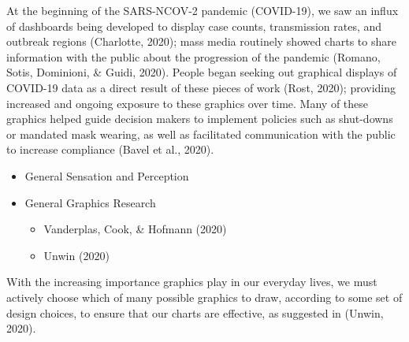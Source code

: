 \documentclass[print]{nuthesis}
\providecommand{\tightlist}{%
  \setlength{\itemsep}{0pt}\setlength{\parskip}{0pt}}
\begin{document}
At the beginning of the SARS-NCOV-2 pandemic (COVID-19), we saw an influx of dashboards being developed to display case counts, transmission rates, and outbreak regions (Charlotte, 2020); mass media routinely showed charts to share information with the public about the progression of the pandemic (Romano, Sotis, Dominioni, \& Guidi, 2020).
People began seeking out graphical displays of COVID-19 data as a direct result of these pieces of work (Rost, 2020); providing increased and ongoing exposure to these graphics over time.
Many of these graphics helped guide decision makers to implement policies such as shut-downs or mandated mask wearing, as well as facilitated communication with the public to increase compliance (Bavel et al., 2020).

\begin{itemize}
\tightlist
\item
  General Sensation and Perception
\item
  General Graphics Research

  \begin{itemize}
  \tightlist
  \item
    Vanderplas, Cook, \& Hofmann (2020)
  \item
    Unwin (2020)
  \end{itemize}
\end{itemize}

With the increasing importance graphics play in our everyday lives, we must actively choose which of many possible graphics to draw, according to some set of design choices, to ensure that our charts are effective, as suggested in (Unwin, 2020).
\end{document}
